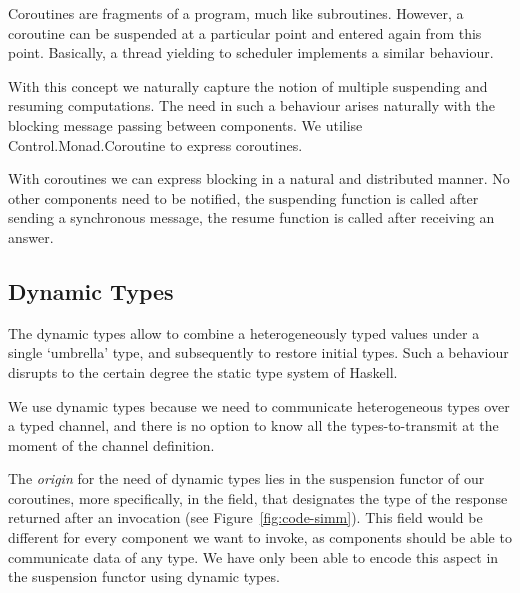 Coroutines are fragments of a program, much like subroutines. 
However, a coroutine can be suspended at a particular point and entered again from this point. 
Basically, a thread yielding to scheduler implements a similar behaviour.

With this concept we naturally capture the notion of multiple suspending and resuming computations.
The need in such a behaviour arises naturally with the blocking message passing between components.
We utilise \textsf{Control.Monad.Coroutine} \cite{cmt} to express coroutines.

With coroutines we can express blocking in a natural and distributed manner.
No other components need to be notified, the suspending function is called after sending a synchronous message, the resume function is called after receiving an answer.

\subsection{Dynamic Types}
The dynamic types \cite{Abadi:1991:DTS:103135.103138} allow to combine
a heterogeneously typed values under a single `umbrella' type, and
subsequently to restore initial types. Such a behaviour disrupts to
the certain degree the static type system of Haskell.

We use dynamic types %
because 
we need to communicate heterogeneous types over a typed channel, and there is no option to know all the types-to-transmit at the moment of the channel definition.

The \emph{origin} for the need of dynamic types lies in the suspension functor of our coroutines, more specifically, in the  field, that designates the type of the response returned after an invocation (see Figure~\ref{fig:code-simm}).
This field would be different for every component we want to invoke, as components should be able to communicate data of any type. %
We have only been able to encode this aspect in the suspension functor using dynamic types.


